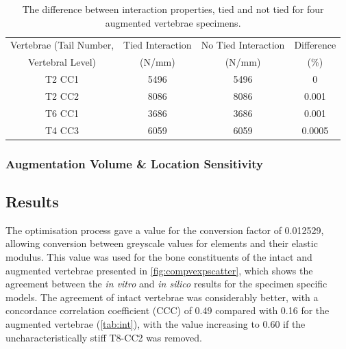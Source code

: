 \begin{table}[ht!]

\caption{The difference between interaction properties, tied and not tied for
four augmented vertebrae specimens.}
\label{tab:meshint}
\centering
  \begin{tabular}{c|c|c|c}
Vertebrae (Tail Number,  & Tied Interaction  & No Tied Interaction  &
Difference \\
Vertebral Level) & (N/mm) & (N/mm) & (\%) \\
\hline
\hline

T2 CC1 &	 5496 &	 5496 &	 0\\
T2 CC2 &	 8086 &	 8086 &	 0.001\\
T6 CC1 &	 3686 &	 3686 &	 0.001\\
T4 CC3 &	 6059 &	 6059 &	 0.0005\\ \hline

\end{tabular}
\end{table}



\subsubsection{Augmentation Volume \& Location Sensitivity}






\subsection{Results} \label{bov:results}

The optimisation process gave a value for the conversion factor of 0.012529, allowing conversion between greyscale values for elements and their elastic modulus. This value was used for the bone constituents of the intact and augmented vertebrae presented in \cref{fig:compvexpscatter}, which shows the agreement between the \textit{in vitro} and \textit{in silico} results for the specimen specific models. The agreement of intact vertebrae was considerably better, with a concordance
correlation coefficient (CCC) of 0.49 compared with 0.16 for the augmented vertebrae (\cref{tab:int}), with the value increasing to 0.60 if the uncharacteristically stiff T8-CC2 was removed.

